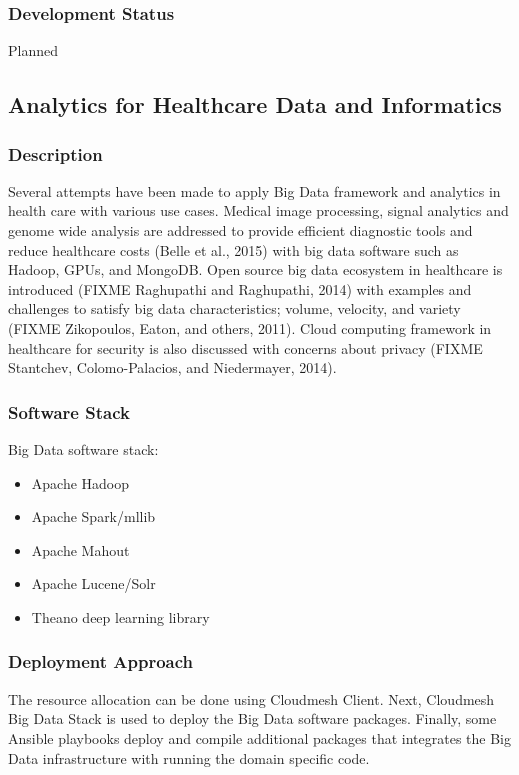 \documentclass[9pt,twocolumn,twoside]{styles/osajnl}
\begin{document}
\subsubsection{Development Status}

Planned


\subsection{Analytics for Healthcare Data and Informatics}

\subsubsection{Description}

Several attempts have been made to apply Big Data framework and
analytics in health care with various use cases. Medical image
processing, signal analytics and genome wide analysis are addressed to
provide efficient diagnostic tools and reduce healthcare costs (Belle
et al., 2015) with big data software such as Hadoop, GPUs, and
MongoDB. Open source big data ecosystem in healthcare is introduced
(FIXME Raghupathi and Raghupathi, 2014) with examples and challenges
to satisfy big data characteristics; volume, velocity, and variety
(FIXME Zikopoulos, Eaton, and others, 2011). Cloud computing framework
in healthcare for security is also discussed with concerns about
privacy (FIXME Stantchev, Colomo-Palacios, and Niedermayer, 2014).


\subsubsection{Software Stack}

Big Data software stack:

\begin{itemize}
\item Apache Hadoop
\item Apache Spark/mllib
\item Apache Mahout
\item Apache Lucene/Solr
\item Theano deep learning library
\end{itemize}

\subsubsection{Deployment Approach}

The resource allocation can be done using Cloudmesh Client.  Next,
Cloudmesh Big Data Stack is used to deploy the Big Data software
packages.  Finally, some Ansible playbooks deploy and compile
additional packages that integrates the Big Data infrastructure with
running the domain specific code.
\end{document}
